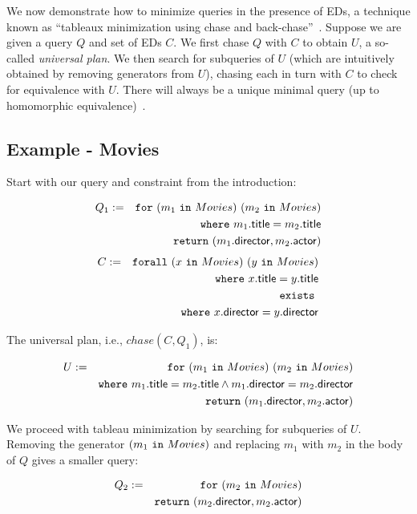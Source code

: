 \documentclass[preprint]{sigplanconf}
\newcommand{\FOR}{{\tt for} \ }
\newcommand{\FORALL}{{\tt forall} \ }
\newcommand{\EXISTS}{{\tt exists} \ }
\newcommand{\WHERE}{{\tt where} \ }
\newcommand{\IN}{ \ {\tt in} \ }
\newcommand{\RETURN}{{\tt return} \ }
\begin{document}
We now demonstrate how to minimize queries in the presence of 
EDs, a technique known as ``tableaux minimization using chase and back-chase''~\cite{Deutsch:2006:QRC:1121995.1122010}.   Suppose we are given a query $Q$ and set of EDs $C$.  
We first chase $Q$ with $C$ to obtain $U$, a so-called {\it universal plan}.  We then 
search for subqueries of $U$ (which are intuitively obtained by removing generators from $U$), chasing each in turn with $C$ to check for equivalence with $U$.  There will always be a unique minimal query (up to homomorphic equivalence)~\cite{Deutsch:2006:QRC:1121995.1122010}.

\subsection*{Example - Movies}
Start with our query and constraint from the introduction:
\begin{normalsize}
\begin{eqnarray*}
Q_1 & := & \FOR (m_1 \IN Movies) \ (m_2 \IN Movies) \\
 & & \WHERE m_1.{\sf title} = m_2.{\sf title} \\
 & & \RETURN (m_1.{\sf director}, m_2.{\sf actor})
\end{eqnarray*}        
\begin{eqnarray*}
C & := & \FORALL (x \IN Movies) \ (y \IN Movies) \\
& & \WHERE x.{\sf title} = y.{\sf title} \\ 
& & \EXISTS \\
& & \WHERE x.{\sf director} = y.{\sf director}
\end{eqnarray*}
\end{normalsize}
The universal plan, i.e., $chase(C,Q_1)$, is:
\begin{normalsize}
\begin{eqnarray*}
U & := & \FOR (m_1 \IN Movies) \ (m_2 \IN Movies) \\
 & & \WHERE m_1.{\sf title} = m_2.{\sf title} \wedge m_1.{\sf director} = m_2.{\sf 
director} \\
 & & \RETURN (m_1.{\sf director}, m_2.{\sf actor})
\end{eqnarray*}        
\end{normalsize}
We proceed with tableau minimization by searching for subqueries of $U$.  
Removing the generator $(m_1 \IN Movies)$ and replacing $m_1$ with $m_2$ in the body of $Q$ gives a smaller query:
\begin{normalsize}
\begin{eqnarray*}
Q_2 & := & \FOR (m_2 \IN Movies) \\
 & & \RETURN (m_2.{\sf director}, m_2.{\sf actor})
\end{eqnarray*}        
\end{normalsize}
\end{document}
